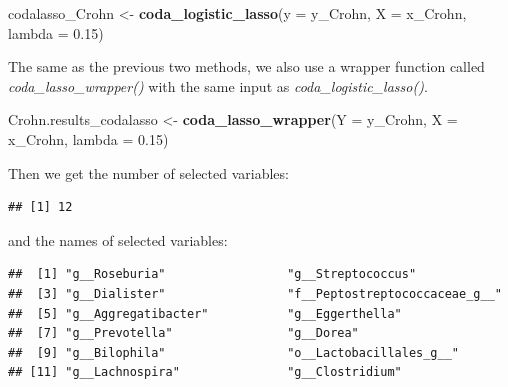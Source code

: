 \documentclass[openany]{book}
\newenvironment{Shaded}{\begin{snugshade}}{\end{snugshade}}
\newcommand{\KeywordTok}[1]{\textcolor[rgb]{0.13,0.29,0.53}{\textbf{#1}}}
\newcommand{\DataTypeTok}[1]{\textcolor[rgb]{0.13,0.29,0.53}{#1}}
\newcommand{\FloatTok}[1]{\textcolor[rgb]{0.00,0.00,0.81}{#1}}
\newcommand{\StringTok}[1]{\textcolor[rgb]{0.31,0.60,0.02}{#1}}
\newcommand{\OperatorTok}[1]{\textcolor[rgb]{0.81,0.36,0.00}{\textbf{#1}}}
\newcommand{\NormalTok}[1]{#1}
\begin{document}
\begin{Shaded}
\begin{Highlighting}[]
\NormalTok{codalasso_Crohn <-}\StringTok{ }\KeywordTok{coda_logistic_lasso}\NormalTok{(}\DataTypeTok{y =}\NormalTok{ y_Crohn, }\DataTypeTok{X =}\NormalTok{ x_Crohn, }\DataTypeTok{lambda =} \FloatTok{0.15}\NormalTok{)}
\end{Highlighting}
\end{Shaded}

The same as the previous two methods, we also use a wrapper function
called \emph{coda\_lasso\_wrapper()} with the same input as
\emph{coda\_logistic\_lasso()}.

\begin{Shaded}
\begin{Highlighting}[]
\NormalTok{Crohn.results_codalasso <-}\StringTok{ }\KeywordTok{coda_lasso_wrapper}\NormalTok{(}\DataTypeTok{Y =}\NormalTok{ y_Crohn, }\DataTypeTok{X =}\NormalTok{ x_Crohn, }
                                              \DataTypeTok{lambda =} \FloatTok{0.15}\NormalTok{)}
\end{Highlighting}
\end{Shaded}

Then we get the number of selected variables:

\begin{Shaded}
\end{Shaded}

\begin{verbatim}
## [1] 12
\end{verbatim}

and the names of selected variables:

\begin{Shaded}
\end{Shaded}

\begin{verbatim}
##  [1] "g__Roseburia"                 "g__Streptococcus"            
##  [3] "g__Dialister"                 "f__Peptostreptococcaceae_g__"
##  [5] "g__Aggregatibacter"           "g__Eggerthella"              
##  [7] "g__Prevotella"                "g__Dorea"                    
##  [9] "g__Bilophila"                 "o__Lactobacillales_g__"      
## [11] "g__Lachnospira"               "g__Clostridium"
\end{verbatim}
\end{document}

